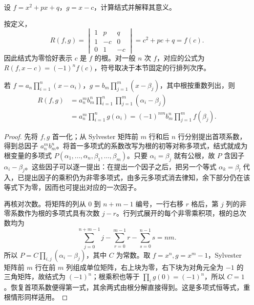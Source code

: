 \begin{example}
设 $f=x^2+px+q$，$g=x-c$，计算结式并解释其意义。
\end{example}
\begin{solve}
按定义，
\[
    R(f,g)=
    \begin{vmatrix}
        1&p&q\\
        1&-c&0\\
        0&1&-c
    \end{vmatrix}
    =c^2+pc+q=f(c).
\]
因此结式为零恰好表示 $c$ 是 $f$ 的根。对一般 $n$ 次 $f$，对应的公式为 $R(f,x-c)=(-1)^nf(c)$，符号取决于本节固定的行排列次序。
\end{solve}

\begin{theorem}[结式的根表示]
\label{thm:resultant-root-product}
若 $f=a_n\prod_{i=1}^n(x-\alpha_i)$，$g=b_m\prod_{j=1}^m(x-\beta_j)$，其中根按重数列出，则
\begin{equation}
\label{eq:resultant-root-product}
\begin{aligned}
    R(f,g)
    &=a_n^mb_m^n\prod_{i=1}^n\prod_{j=1}^m(\alpha_i-\beta_j)\\
    &=a_n^m\prod_{i=1}^n g(\alpha_i)
     =(-1)^{nm}b_m^n\prod_{j=1}^m f(\beta_j).
\end{aligned}
\end{equation}
\end{theorem}
\begin{proof}
先将 $f,g$ 首一化；从 Sylvester 矩阵前 $m$ 行和后 $n$ 行分别提出首项系数，得到总因子 $a_n^mb_m^n$。将首一多项式的系数改写为根的初等对称多项式，结式就成为根变量的多项式 $P(\alpha_1,\ldots,\alpha_n,\beta_1,\ldots,\beta_m)$。只要 $\alpha_i=\beta_j$ 就有公根，故 $P$ 含因子 $\alpha_i-\beta_j$。这些因子可以逐一提出：在提出一个因子之后，把另一个等式 $\alpha_k=\beta_l$ 代入，已提出因子的乘积仍为非零多项式，由多元多项式消去律知，余下部分仍在该等式下为零，因而也可提出对应的一次因子。

再核对次数。将矩阵的列从 $0$ 到 $n+m-1$ 编号，一行右移 $r$ 格后，第 $j$ 列的非零系数作为根的多项式具有次数 $j-r$。行列式展开的每个非零乘积项，根的总次数均为
\[
    \sum_{j=0}^{n+m-1}j-\sum_{r=0}^{m-1}r-\sum_{s=0}^{n-1}s=nm.
\]
所以 $P=C\prod_{i,j}(\alpha_i-\beta_j)$，其中 $C$ 为常数。取 $f=x^n,g=x^m-1$，Sylvester 矩阵前 $m$ 行在前 $m$ 列组成单位矩阵，右上块为零，右下块为对角元全为 $-1$ 的三角矩阵，故结式为 $(-1)^n$；根乘积也等于 $\prod_i g(0)=(-1)^n$，所以 $C=1$。恢复首项系数便得第一式，其余两式由根分解直接得到。这是多项式恒等式，重根情形同样适用。
\end{proof}

